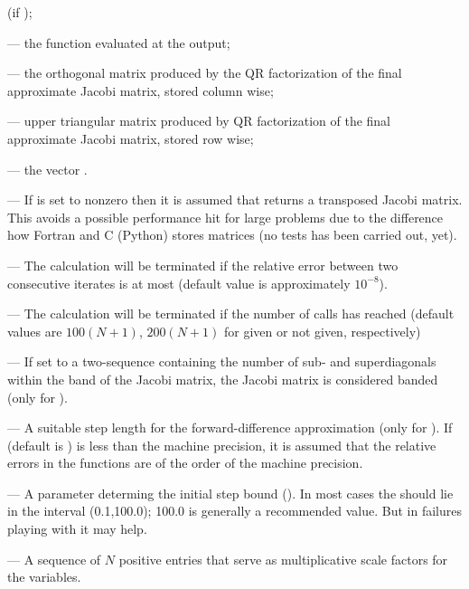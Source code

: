 \begin{description}
\begin{description}
     (if );
  \item[\code{'fvec'}] --- the function evaluated at the output;
  \item[\code{'fjac'}] --- the orthogonal matrix  produced by
    the QR factorization of the final approximate Jacobi matrix,
    stored column wise;
  \item[\code{'r'}] --- upper triangular matrix produced by QR
    factorization of the final approximate Jacobi matrix, stored row
    wise;
  \item[\code{'qtf'}] --- the vector .
  \end{description}
\item[\code{col\_deriv}] --- If  is set to nonzero
  then it is assumed that  returns a transposed Jacobi
  matrix. This avoids a possible performance hit for large problems
  due to the difference how Fortran and C (Python) stores matrices
  (no tests has been carried out, yet).
\item[\code{xtol}] --- The calculation will be terminated if the
  relative error between two consecutive iterates is at most
   (default value is approximately $10^{-8}$).
\item[\code{maxfev}] --- The calculation will be terminated if the
  number of calls has reached  (default values are
  $100(N+1)$, $200(N+1)$ for  given or not given,
  respectively)
\item[\code{band}] --- If set to a two-sequence containing the number
  of sub- and superdiagonals within the band of the Jacobi matrix,
  the Jacobi matrix is considered banded (only for ). 
\item[\code{epsfcn}] --- A suitable step length for the
  forward-difference approximation (only for ). If
   (default is ) is less than the machine
  precision, it is assumed that the relative errors in the functions
  are of the order of the machine precision.
\item[\code{factor}] --- A parameter determing the initial step bound
  (). In most cases the 
  should lie in the interval (0.1,100.0); 100.0 is generally a
  recommended value. But in failures playing with it may help.
\item[\code{diag}] --- A sequence of $N$ positive entries that serve
  as multiplicative scale factors for the variables.
\end{description}

